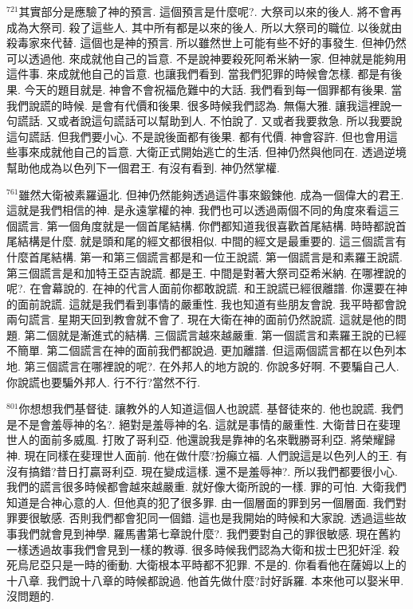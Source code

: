 \documentclass{book}
\begin{document}
$^{721}$其實部分是應驗了神的預言.
這個預言是什麼呢?.
大祭司以來的後人.
將不會再成為大祭司.
殺了這些人.
其中所有都是以來的後人.
所以大祭司的職位.
以後就由殺毒家來代替.
這個也是神的預言.
所以雖然世上可能有些不好的事發生.
但神仍然可以透過他.
來成就他自己的旨意.
不是說神要殺死阿希米納一家.
但神就是能夠用這件事.
來成就他自己的旨意.
也讓我們看到.
當我們犯罪的時候會怎樣.
都是有後果.
今天的題目就是.
神會不會祝福危難中的大話.
我們看到每一個罪都有後果.
當我們說謊的時候.
是會有代價和後果.
很多時候我們認為.
無傷大雅.
讓我這裡說一句謊話.
又或者說這句謊話可以幫助到人.
不怕說了.
又或者我要救急.
所以我要說這句謊話.
但我們要小心.
不是說後面都有後果.
都有代價.
神會容許.
但也會用這些事來成就他自己的旨意.
大衛正式開始逃亡的生活.
但神仍然與他同在.
透過逆境幫助他成為以色列下一個君王.
有沒有看到.
神仍然掌權.

$^{761}$雖然大衛被素羅逼北.
但神仍然能夠透過這件事來鍛鍊他.
成為一個偉大的君王.
這就是我們相信的神.
是永遠掌權的神.
我們也可以透過兩個不同的角度來看這三個謊言.
第一個角度就是一個首尾結構.
你們都知道我很喜歡首尾結構.
時時都說首尾結構是什麼.
就是頭和尾的經文都很相似.
中間的經文是最重要的.
這三個謊言有什麼首尾結構.
第一和第三個謊言都是和一位王說謊.
第一個謊言是和素羅王說謊.
第三個謊言是和加特王亞吉說謊.
都是王.
中間是對著大祭司亞希米納.
在哪裡說的呢?.
在會幕說的.
在神的代言人面前你都敢說謊.
和王說謊已經很離譜.
你還要在神的面前說謊.
這就是我們看到事情的嚴重性.
我也知道有些朋友會說.
我平時都會說兩句謊言.
星期天回到教會就不會了.
現在大衛在神的面前仍然說謊.
這就是他的問題.
第二個就是漸進式的結構.
三個謊言越來越嚴重.
第一個謊言和素羅王說的已經不簡單.
第二個謊言在神的面前我們都說過.
更加離譜.
但這兩個謊言都在以色列本地.
第三個謊言在哪裡說的呢?.
在外邦人的地方說的.
你說多好啊.
不要騙自己人.
你說謊也要騙外邦人.
行不行?當然不行.

$^{801}$你想想我們基督徒.
讓教外的人知道這個人也說謊.
基督徒來的.
他也說謊.
我們是不是會羞辱神的名?.
絕對是羞辱神的名.
這就是事情的嚴重性.
大衛昔日在斐理世人的面前多威風.
打敗了哥利亞.
他還說我是靠神的名來戰勝哥利亞.
將榮耀歸神.
現在同樣在斐理世人面前.
他在做什麼?扮癲立福.
人們說這是以色列人的王.
有沒有搞錯?昔日打贏哥利亞.
現在變成這樣.
還不是羞辱神?.
所以我們都要很小心.
我們的謊言很多時候都會越來越嚴重.
就好像大衛所說的一樣.
罪的可怕.
大衛我們知道是合神心意的人.
但他真的犯了很多罪.
由一個層面的罪到另一個層面.
我們對罪要很敏感.
否則我們都會犯同一個錯.
這也是我開始的時候和大家說.
透過這些故事我們就會見到神學.
羅馬書第七章說什麼?.
我們要對自己的罪很敏感.
現在舊約一樣透過故事我們會見到一樣的教導.
很多時候我們認為大衛和拔士巴犯奸淫.
殺死烏尼亞只是一時的衝動.
大衛根本平時都不犯罪.
不是的.
你看看他在薩姆以上的十八章.
我們說十八章的時候都說過.
他首先做什麼?討好訴羅.
本來他可以娶米甲.
沒問題的.
\end{document}
